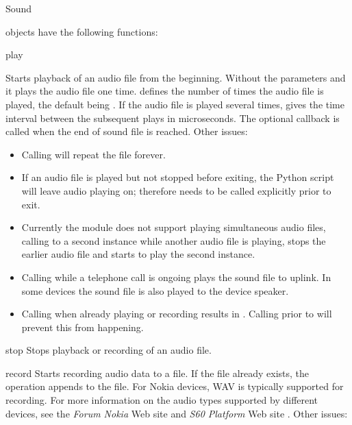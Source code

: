 \begin{classdesc*}{Sound}

 objects have the following functions:

\begin{methoddesc}[Sound]{play}{}

Starts playback of an audio file from the beginning. Without the parameters 
 and  it plays the audio file one time. 
 defines the number of times the audio file is played, the 
default being . If the audio file is played several times, 
 gives the time interval between the subsequent plays in 
microseconds. The optional callback is called when the end of sound file is 
reached. Other issues: 

\begin{itemize}
\item Calling  will repeat the file forever. 
\item If an audio file is played but not stopped before exiting, the Python script will leave audio playing on; therefore  needs to be called explicitly prior to exit.
\item Currently the module does not support playing simultaneous audio files, calling  to a second  instance while another audio file is playing, stops the earlier audio file and starts to play the second  instance.
\item Calling  while a telephone call is ongoing plays the sound file to uplink. In some devices the sound file is also played to the device speaker.
\item Calling  when already playing or recording results in . Calling  prior to  will prevent this from happening.
\end{itemize}
\end{methoddesc}

\begin{methoddesc}[Sound]{stop}{}
Stops playback or recording of an audio file.
\end{methoddesc}

\begin{methoddesc}[Sound]{record}{}
Starts recording audio data to a file. If the file already exists, the 
operation appends to the file. For Nokia devices, WAV is typically supported 
for recording. For more information on the audio types supported by 
different devices, see the \textit{Forum Nokia} Web site 
\cite{S60AudioVideo} and \textit{S60 Platform} Web site 
\cite{S60Developers}. Other issues:


\end{methoddesc}
\end{classdesc*}
